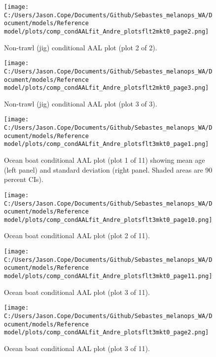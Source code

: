 \documentclass[11pt,
  english,
  letterpaper,
]{article}
\begin{document}
\begin{figure}
\centering
\texttt{[image: C:/Users/Jason.Cope/Documents/Github/Sebastes\_melanops\_WA/Document/models/Reference model/plots/comp\_condAALfit\_Andre\_plotsflt2mkt0\_page2.png]}
\caption{Non-trawl (jig) conditional AAL plot (plot 2 of 2).\label{fig:comp_condAALfit_Andre_plotsflt2mkt0_page2}}
\end{figure}

\begin{figure}
\centering
\texttt{[image: C:/Users/Jason.Cope/Documents/Github/Sebastes\_melanops\_WA/Document/models/Reference model/plots/comp\_condAALfit\_Andre\_plotsflt2mkt0\_page3.png]}
\caption{Non-trawl (jig) conditional AAL plot (plot 3 of 3).\label{fig:comp_condAALfit_Andre_plotsflt2mkt0_page3}}
\end{figure}

\begin{figure}
\centering
\texttt{[image: C:/Users/Jason.Cope/Documents/Github/Sebastes\_melanops\_WA/Document/models/Reference model/plots/comp\_condAALfit\_Andre\_plotsflt3mkt0\_page1.png]}
\caption{Ocean boat conditional AAL plot (plot 1 of 11) showing mean age (left panel) and standard deviation (right panel. Shaded areas are 90 percent CIs).\label{fig:comp_condAALfit_Andre_plotsflt3mkt0_page1}}
\end{figure}

\begin{figure}
\centering
\texttt{[image: C:/Users/Jason.Cope/Documents/Github/Sebastes\_melanops\_WA/Document/models/Reference model/plots/comp\_condAALfit\_Andre\_plotsflt3mkt0\_page10.png]}
\caption{Ocean boat conditional AAL plot (plot 2 of 11).\label{fig:comp_condAALfit_Andre_plotsflt3mkt0_page10}}
\end{figure}

\begin{figure}
\centering
\texttt{[image: C:/Users/Jason.Cope/Documents/Github/Sebastes\_melanops\_WA/Document/models/Reference model/plots/comp\_condAALfit\_Andre\_plotsflt3mkt0\_page11.png]}
\caption{Ocean boat conditional AAL plot (plot 3 of 11).\label{fig:comp_condAALfit_Andre_plotsflt3mkt0_page11}}
\end{figure}

\begin{figure}
\centering
\texttt{[image: C:/Users/Jason.Cope/Documents/Github/Sebastes\_melanops\_WA/Document/models/Reference model/plots/comp\_condAALfit\_Andre\_plotsflt3mkt0\_page2.png]}
\caption{Ocean boat conditional AAL plot (plot 3 of 11).\label{fig:comp_condAALfit_Andre_plotsflt3mkt0_page2}}
\end{figure}
\end{document}
